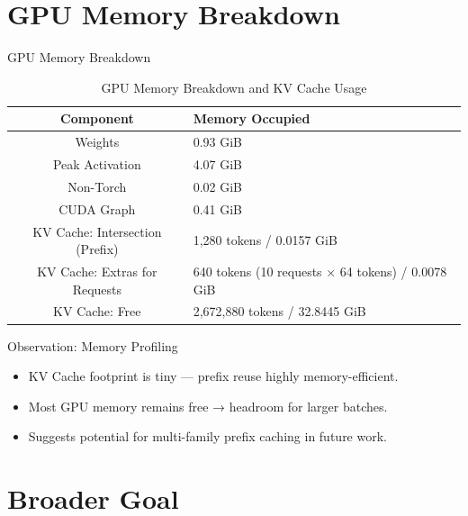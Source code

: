 \documentclass[Serif, 10pt, brown]{beamer}
\theoremstyle{example}
\theoremstyle{plain}
\begin{document}
\section{GPU Memory Breakdown}

\begin{frame}{GPU Memory Breakdown}
    \begin{table}[h!]
\centering
\begin{tabular}{|c|p{4cm}|}
\hline
\textbf{Component} & \textbf{Memory Occupied} \\
\hline
Weights  & 0.93 GiB \\
\hline
Peak Activation  & 4.07 GiB \\
\hline
Non-Torch  & 0.02 GiB \\
\hline
CUDA Graph & 0.41 GiB \\
\hline
KV Cache: Intersection (Prefix)  & 1,280 tokens / 0.0157 GiB \\
\hline
KV Cache: Extras for Requests  & 640 tokens (10 requests × 64 tokens) / 0.0078 GiB \\
\hline
KV Cache: Free & 2,672,880 tokens / 32.8445 GiB \\
\hline
\end{tabular}
\caption{GPU Memory Breakdown and KV Cache Usage}
\label{tab:gpu_memory_breakdown}
\end{table}
\end{frame}

\begin{frame}{Observation: Memory Profiling}
\begin{itemize}
    \item KV Cache footprint is tiny — prefix reuse highly memory-efficient.
    \item Most GPU memory remains free → headroom for larger batches.
    \item Suggests potential for multi-family prefix caching in future work.
\end{itemize}
\end{frame}

\section{Broader Goal}
\end{document}
